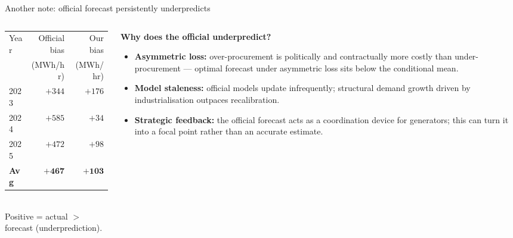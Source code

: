 \documentclass[10pt,aspectratio=169]{beamer}
\begin{document}
\begin{frame}{Another note: official forecast persistently underpredicts}
  \begin{columns}
    \begin{column}{0.42\textwidth}
      \small
      \begin{tabular}{lrr}
        \toprule
        Year & Official bias & Our bias \\
             & (MWh/hr) & (MWh/hr) \\
        \midrule
        2023 & $+344$ & $+176$ \\
        2024 & $+585$ & $+34$  \\
        2025 & $+472$ & $+98$  \\
        \midrule
        \textbf{Avg} & $\mathbf{+467}$ & $\mathbf{+103}$ \\
        \bottomrule
      \end{tabular}\\[0.4em]
      Positive = actual $>$ forecast (underprediction).
    \end{column}
    \begin{column}{0.55\textwidth}
      \textbf{Why does the official underpredict?}\\[0.4em]
      \small
      \begin{itemize}
        \item \textbf{Asymmetric loss:} over-procurement is
              politically and contractually more costly than
              under-procurement --- optimal forecast under
              asymmetric loss sits below the conditional mean.
        \item \textbf{Model staleness:} official models update
              infrequently; structural demand growth driven by
              industrialisation outpaces
              recalibration.
        \item \textbf{Strategic feedback:} the official forecast
              acts as a coordination device for generators; this
              can turn it into a focal point rather than an
              accurate estimate.
      \end{itemize}
    \end{column}
  \end{columns}
\end{frame}
\end{document}
